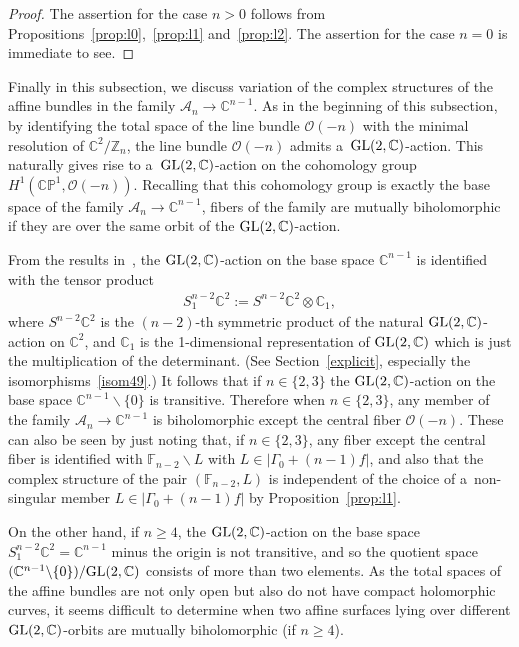 \begin{proof}
The assertion for the case $n>0$ follows from Propositions~\ref{prop:l0},~\ref{prop:l1} and~\ref{prop:l2}.
The assertion for the case $n=0$ is immediate to see.
\end{proof}

Finally in this subsection, we discuss variation of the complex structures of the af\/f\/ine bundles in the family
$\mathscr A_n\to\mathbb{C}^{n-1}$.
As in the beginning of this subsection, by identifying the total space of the line bundle $\mathscr O(-n)$ with the
minimal resolution of $\mathbb{C}^2/\mathbb{Z}_n$, the line bundle $\mathscr O(-n)$ admits
a~${\rm{GL}}(2,\mathbb{C})$-action.
This naturally gives rise to a~${\rm{GL}}(2,\mathbb{C})$-action on the cohomology group $H^1(\mathbb{CP}^1,\mathscr
O(-n))$.
Recalling that this cohomology group is exactly the base space of the family $\mathscr A_n\to\mathbb{C}^{n-1}$, f\/ibers
of the family are mutually biholomorphic if they are over the same orbit of the ${\rm{GL}}(2,\mathbb{C})$-action.

From the results in~\cite{HonCMP2}, the ${\rm{GL}}(2,\mathbb{C})$-action on the base space $\mathbb{C}^{n-1}$ is
identif\/ied with the tensor product
\begin{gather*}
S_1^{n-2}\mathbb{C}^2:=S^{n-2}\mathbb{C}^2\otimes\mathbb{C}_1,
\end{gather*}
where $S^{n-2}\mathbb{C}^2$ is the $(n-2)$-th symmetric product of the natural ${\rm{GL}}(2,\mathbb{C})$-action on
$\mathbb{C}^2$, and $\mathbb{C}_1$ is the 1-dimensional representation of ${\rm{GL}}(2,\mathbb{C})$ which is just the
multiplication of the determinant.
(See Section~\ref{explicit}, especially the isomorphisms~\eqref{isom49}.) It follows that if $n\in\{2,3\}$ the
${\rm{GL}}(2,\mathbb{C})$-action on the base space $\mathbb{C}^{n-1}\backslash\{0\}$ is transitive.
Therefore when $n\in\{2,3\}$, any member of the family $\mathscr A_n\to\mathbb{C}^{n-1}$ is biholomorphic except the
central f\/iber $\mathscr O(-n)$.
These can also be seen by just noting that, if $n\in\{2,3\}$, any f\/iber except the central f\/iber is identif\/ied
with $\mathbb{F}_{n-2}\backslash L$ with $L\in |\Gamma_0+(n-1)f|$, and also that the complex structure of the pair
$(\mathbb{F}_{n-2},L)$ is independent of the choice of a~non-singular member $L\in|\Gamma_0+(n-1)f|$ by
Proposition~\ref{prop:l1}.

On the other hand, if $n\ge 4$, the ${\rm{GL}}(2,\mathbb{C})$-action on the base space
$S_1^{n-2}\mathbb{C}^2=\mathbb{C}^{n-1}$ minus the origin is not transitive, and so the quotient space
$(\mathbb{C}^{n-1}\backslash\{0\})/{\rm{GL}}(2,\mathbb{C})$ consists of more than two elements.
As the total spaces of the af\/f\/ine bundles are not only open but also do not have compact holomorphic curves, it
seems dif\/f\/icult to determine when two af\/f\/ine surfaces lying over dif\/ferent ${\rm{GL}}(2,\mathbb{C})$-orbits
are mutually biholomorphic (if $n\ge 4$).


